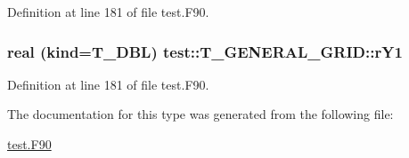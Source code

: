 Definition at line 181 of file test.F90.

\hypertarget{typetest_1_1_t___g_e_n_e_r_a_l___g_r_i_d_a0f137476a138c34931d99f5d839c31ca}{
\subsubsection[{rY1}]{\setlength{\rightskip}{0pt plus 5cm}real (kind={\bf T\_\-DBL}) {\bf test::T\_\-GENERAL\_\-GRID::rY1}}}
\label{typetest_1_1_t___g_e_n_e_r_a_l___g_r_i_d_a0f137476a138c34931d99f5d839c31ca}


Definition at line 181 of file test.F90.



The documentation for this type was generated from the following file:\begin{DoxyCompactItemize}
\item 
\hyperlink{test_8_f90}{test.F90}\end{DoxyCompactItemize}
